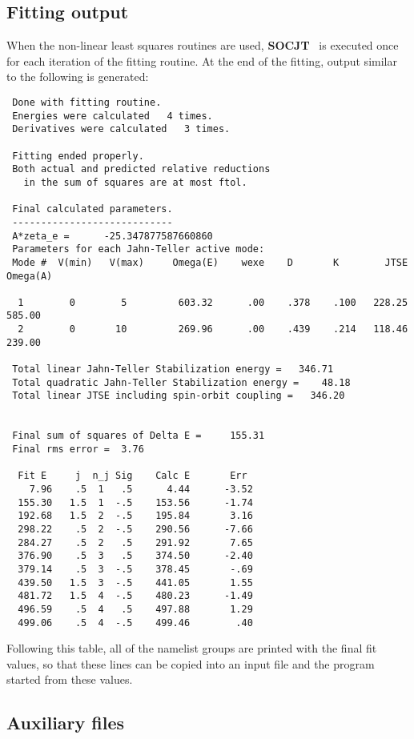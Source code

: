 \documentclass{article}
\newcommand{\socjt}{{\bf SOCJT }}
\begin{document}
\subsection{Fitting output}

When the non-linear least squares routines are used, \socjt\ is
executed once for each iteration of the fitting routine. At the end of
the fitting, output similar to the following is generated:
\begin{verbatim}
 Done with fitting routine.
 Energies were calculated   4 times.
 Derivatives were calculated   3 times.
 
 Fitting ended properly.
 Both actual and predicted relative reductions
   in the sum of squares are at most ftol.
 
 Final calculated parameters.
 ----------------------------
 A*zeta_e =      -25.347877587660860
 Parameters for each Jahn-Teller active mode:
 Mode #  V(min)   V(max)     Omega(E)    wexe    D       K        JTSE  Omega(A)
 
  1        0        5         603.32      .00    .378    .100   228.25    585.00
  2        0       10         269.96      .00    .439    .214   118.46    239.00
 
 Total linear Jahn-Teller Stabilization energy =   346.71
 Total quadratic Jahn-Teller Stabilization energy =    48.18
 Total linear JTSE including spin-orbit coupling =   346.20
 
 
 Final sum of squares of Delta E =     155.31
 Final rms error =  3.76
 
  Fit E     j  n_j Sig    Calc E       Err
    7.96    .5  1   .5      4.44      -3.52
  155.30   1.5  1  -.5    153.56      -1.74
  192.68   1.5  2  -.5    195.84       3.16
  298.22    .5  2  -.5    290.56      -7.66
  284.27    .5  2   .5    291.92       7.65
  376.90    .5  3   .5    374.50      -2.40
  379.14    .5  3  -.5    378.45       -.69
  439.50   1.5  3  -.5    441.05       1.55
  481.72   1.5  4  -.5    480.23      -1.49
  496.59    .5  4   .5    497.88       1.29
  499.06    .5  4  -.5    499.46        .40
\end{verbatim}

Following this table, all of the namelist groups are printed with the
final fit values, so that these lines can be copied into an input file
and the program started from these values.

\subsection{Auxiliary files} \label{section:outputaux}
\end{document}
